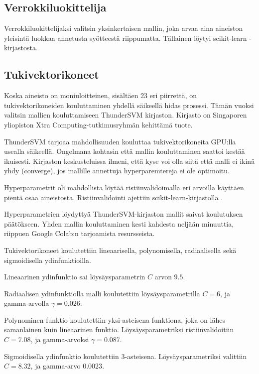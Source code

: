 \documentclass[finnish,twoside,openright]{HYgraduMLDS}
\begin{document}
\subsection{Verrokkiluokittelija}

Verrokkiluokittelijaksi valitsin yksinkertaisen mallin, joka arvaa aina aineiston yleisintä luokkaa annetusta syötteestä riippumatta. Tällainen löytyi scikit-learn \cite{scikit-learn}-kirjastosta.


\subsection{Tukivektorikoneet}

Koska aineisto on moniuloitteinen, sisältäen 23 eri piirrettä, on tukivektorikoneiden kouluttaminen yhdellä säikeellä hidas prosessi. Tämän vuoksi valitsin mallien kouluttamiseen ThunderSVM \cite{wenthundersvm18} kirjaston. Kirjasto on Singaporen yliopiston Xtra Computing-tutkimusryhmän kehittämä tuote.

ThunderSVM tarjoaa mahdollisuuden kouluttaa tukivektorikoneita GPU:lla usealla säikeellä. Ongelmana kohtasin että mallin kouluttaminen saattoi kestää ikuisesti. Kirjaston keskusteluissa ilmeni, että kyse voi olla siitä että malli ei ikinä yhdy (converge), jos mallille annettuja hyperparemtereja ei ole optimoitu.

Hyperparametrit oli mahdollista löytää ristiinvalidoimalla eri arvoilla käyttäen pientä osaa aineistosta. Ristiinvalidointi ajettiin scikit-learn-kirjastolla \cite{scikit-learn}. 

Hyperparametrien löydyttyä ThunderSVM-kirjaston mallit saivat koulutuksen päätökseen. Yhden mallin kouluttaminen kesti kahdesta neljään minuuttia, riippuen Google Colab:n \cite{google-colab} tarjoamista resursseista.

Tukivektorikoneet koulutettiin lineaarisella, polynomisella, radiaalisella sekä sigmoidisella ydinfunktioilla.

Lineaarinen ydinfunktio sai löysäysparametrin $C$ arvon $9.5$. 

Radiaalisen ydinfunktiolla malli koulutettiin löysäysparametrilla $C = 6$, ja gamma-arvolla $\gamma = 0.026$.

Polynominen funktio koulutettiin yksi-asteisena funktiona, joka on lähes samanlainen kuin lineaarinen funktio. Löysäysparametriksi ristiinvalidoitiin $C = 7.08$, ja gamma-arvoksi $\gamma = 0.087$.

Sigmoidisella ydinfunktio koulutettiin 3-asteisena. Löysäysparametriksi valittiin $C = 8.32$, ja gamma-arvo $0.0023$.
\end{document}
